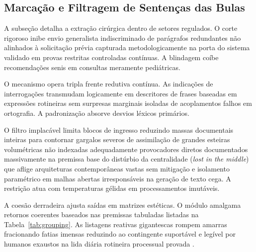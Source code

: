 \documentclass[12pt]{article}
\begin{document}
\subsection{Marcação e Filtragem de Sentenças das Bulas}
\label{subsec:filtragem}

A subseção detalha a extração cirúrgica dentro de setores regulados. O corte rigoroso inibe envio generalista indiscriminado de parágrafos redundantes não alinhados à solicitação prévia capturada metodologicamente na porta do sistema validado em provas restritas controladas contínuas. A blindagem coíbe recomendações senis em consultas meramente pediátricas.

O mecanismo opera tripla frente redutiva contínua. As indicações de interrogações transmudam logicamente em descritores de frases baseadas em expressões rotineiras sem surpresas marginais isoladas de acoplamentos falhos em ortografia. A padronização absorve desvios léxicos primários.

O filtro implacável limita blocos de ingresso reduzindo massas documentais inteiras para contornar gargalos severos de assimilação de grandes esteiras volumétricas não indexadas adequadamente provocadores diretos documentados massivamente na premissa base do distúrbio da centralidade (\textit{lost in the middle}) que aflige arquiteturas contemporâneas vastas sem mitigação e isolamento paramétrico em malhas abertas irresponsáveis na geração de texto cega. A restrição atua com temperaturas gélidas em processamentos imutáveis.

A coesão derradeira ajusta saídas em matrizes estéticas. O módulo amalgama retornos coerentes baseados nas premissas tabuladas listadas na Tabela~\ref{tab:grouping}. As listagens reativas gigantescas rompem amarras fracionando fatias imensas reduzindo ao contingente suportável e legível por humanos exaustos na lida diária rotineira processual provada \cite{pinto2013bulas}.
\end{document}

